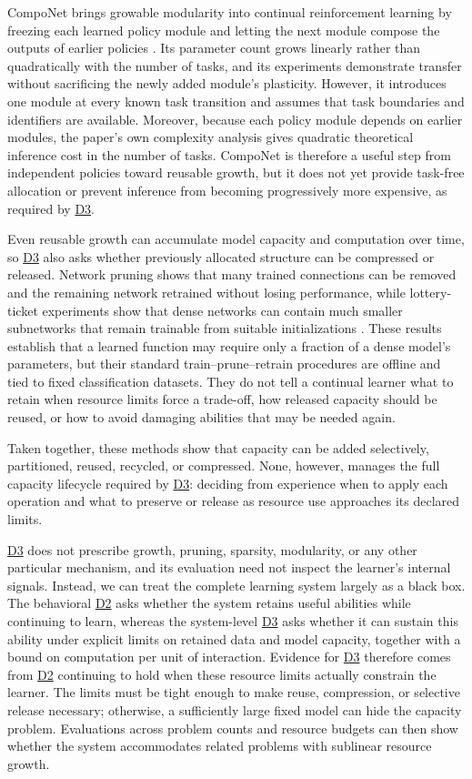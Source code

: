 \documentclass[10pt,journal,compsoc]{IEEEtran}
\DeclareRobustCommand{\Dref}[1]{\hyperref[sec:d#1]{D#1}}
\begin{document}
CompoNet brings growable modularity into continual reinforcement learning by freezing each learned policy module and letting the next module compose the outputs of earlier policies \cite{malagon2024}.
Its parameter count grows linearly rather than quadratically with the number of tasks, and its experiments demonstrate transfer without sacrificing the newly added module's plasticity.
However, it introduces one module at every known task transition and assumes that task boundaries and identifiers are available.
Moreover, because each policy module depends on earlier modules, the paper's own complexity analysis gives quadratic theoretical inference cost in the number of tasks.
CompoNet is therefore a useful step from independent policies toward reusable growth, but it does not yet provide task-free allocation or prevent inference from becoming progressively more expensive, as required by \Dref{3}.

Even reusable growth can accumulate model capacity and computation over time, so \Dref{3} also asks whether previously allocated structure can be compressed or released.
Network pruning shows that many trained connections can be removed and the remaining network retrained without losing performance, while lottery-ticket experiments show that dense networks can contain much smaller subnetworks that remain trainable from suitable initializations \cite{han2015,frankle2019}.
These results establish that a learned function may require only a fraction of a dense model's parameters, but their standard train--prune--retrain procedures are offline and tied to fixed classification datasets.
They do not tell a continual learner what to retain when resource limits force a trade-off, how released capacity should be reused, or how to avoid damaging abilities that may be needed again.

Taken together, these methods show that capacity can be added selectively, partitioned, reused, recycled, or compressed.
None, however, manages the full capacity lifecycle required by \Dref{3}: deciding from experience when to apply each operation and what to preserve or release as resource use approaches its declared limits.

\Dref{3} does not prescribe growth, pruning, sparsity, modularity, or any other particular mechanism, and its evaluation need not inspect the learner's internal signals.
Instead, we can treat the complete learning system largely as a black box.
The behavioral \Dref{2} asks whether the system retains useful abilities while continuing to learn, whereas the system-level \Dref{3} asks whether it can sustain this ability under explicit limits on retained data and model capacity, together with a bound on computation per unit of interaction.
Evidence for \Dref{3} therefore comes from \Dref{2} continuing to hold when these resource limits actually constrain the learner.
The limits must be tight enough to make reuse, compression, or selective release necessary; otherwise, a sufficiently large fixed model can hide the capacity problem.
Evaluations across problem counts and resource budgets can then show whether the system accommodates related problems with sublinear resource growth.
\end{document}
